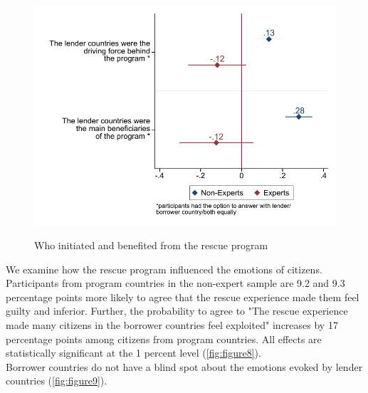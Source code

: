 \begin{figure}[h!] 
\begin{center}
     \caption{Who initiated and benefited from the rescue program}
     \includegraphics[scale=0.8]{Question3_4_base.pdf}
     \label{fig:figure7}
     \end{center}
     \tiny
\end{figure}
We examine how the rescue program influenced the emotions of citizens. Participants from program countries in the non-expert sample are 9.2 and 9.3 percentage points more likely to agree that the rescue experience made them feel guilty and inferior. Further, the probability to agree to "The rescue experience made many citizens in the borrower countries feel exploited" increases by 17 percentage points among citizens from program countries. All effects are statistically significant at the 1 percent level (\autoref{fig:figure8}).  \\
Borrower countries do not have a blind spot about the emotions evoked by lender countries (\autoref{fig:figure9}).  \\


